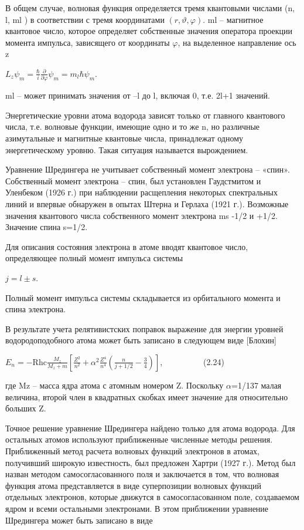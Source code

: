 \documentclass[a4paper,14pt, openany, twoside, draft]{extbook} %
\begin{document}
В общем случае, волновая функция определяется тремя квантовыми числами (n, l, ml ) в соответствии с тремя координатами  $(r,\vartheta ,\varphi )$. ml – магнитное квантовое число, которое определяет собственные значения оператора проекции момента импульса, зависящего от координаты ${\varphi}$, на выделенное направление ось z

 $L_z\psi _m=\frac{\hbar } i\frac{\partial }{\partial \varphi }\psi _m=m_l\hbar \psi _m$.

ml – может принимать значения от –l до l, включая 0, т.е. 2l+1 значений.

Энергетические уровни атома водорода зависят только от главного квантового числа, т.е. волновые функции, имеющие одно и то же n, но различные азимутальные и магнитные квантовые числа, принадлежат одному энергетическому уровню. Такая ситуация называется вырождением.

Уравнение Шредингера не учитывает собственный момент электрона – «спин». Собственный момент электрона – спин, был установлен Гаудстмитом и Уленбеком (1926 г.) при наблюдении расщепления некоторых спектральных линий и впервые обнаружен в опытах Штерна и Герлаха (1921 г.). Возможные значения квантового числа собственного момент электрона ms {}-1/2 и +1/2. Значение спина s=1/2.

Для описания состояния электрона в атоме вводят квантовое число, определяющее полный момент импульса системы

 $j=l\pm s$.

Полный момент импульса системы складывается из орбитального момента и спина электрона.

В результате учета релятивистских поправок выражение для энергии уровней водородоподобного атома может быть записано в следующем виде [Блохин]

 $E_n=-{\text{Rhc}}\frac{M_z}{M_z+m}\left[\frac{Z^2}{n^2}+\alpha ^2\frac{Z^4}{n^4}\left(\frac n{j+1/2}-\frac 3 4\right)\right]$,\ \ \ \ \ \ \ \ \ \ (2.24)

где Mz – масса ядра атома с атомным номером Z. Поскольку ${\alpha}$=1/137 малая величина, второй член в квадратных скобках имеет значение для относительно больших Z.

Точное решение уравнение Шредингера найдено только для атома водорода. Для остальных атомов используют приближенные численные методы решения. Приближенный метод расчета волновых функций электронов в атомах, получивший широкую известность, был предложен Хартри (1927 г.). Метод был назван методом самосогласованного поля и заключается в том, что волновая функция атома представляется в виде суперпозиции волновых функций отдельных электронов, которые движутся в самосогласованном поле, создаваемом ядром и всеми остальными электронами. В этом приближении уравнение Шредингера может быть записано в виде
\end{document}
